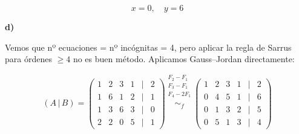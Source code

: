 \documentclass[a4paper,12pt]{article}
\begin{document}
\begin{ejercicio}[title=Ejercicio 26]
\vspace{0.5em}

\[
\boxed{\,x = 0,\quad y = 6\,}
\]

\vspace{0.5em}

\textbf{d)}

Vemos que nº ecuaciones = nº incógnitas = 4, pero aplicar la regla de Sarrus para órdenes $\ge 4$ no es buen método. Aplicamos Gauss–Jordan directamente:

\[
(A\,|\,B)=
\begin{pmatrix}
1 & 2 & 3 & 1 &\Big|& 2\\
1 & 6 & 1 & 2 &\Big|& 1\\
1 & 3 & 6 & 3 &\Big|& 0\\
2 & 2 & 0 & 5 &\Big|& 1
\end{pmatrix}
\overset{\substack{F_2 - F_1 \\ F_3 - F_1 \\ F_4 - 2F_1\\{}}}{\sim_f}
\begin{pmatrix}
1 & 2 & 3 & 1 &\Big|& 2\\
0 & 4 & 5 & 1 &\Big|& 6\\
0 & 1 & 3 & 2 &\Big|& 5\\
0 & 5 & 1 & 3 &\Big|& 4
\end{pmatrix}
\]
\end{ejercicio}
\end{document}
